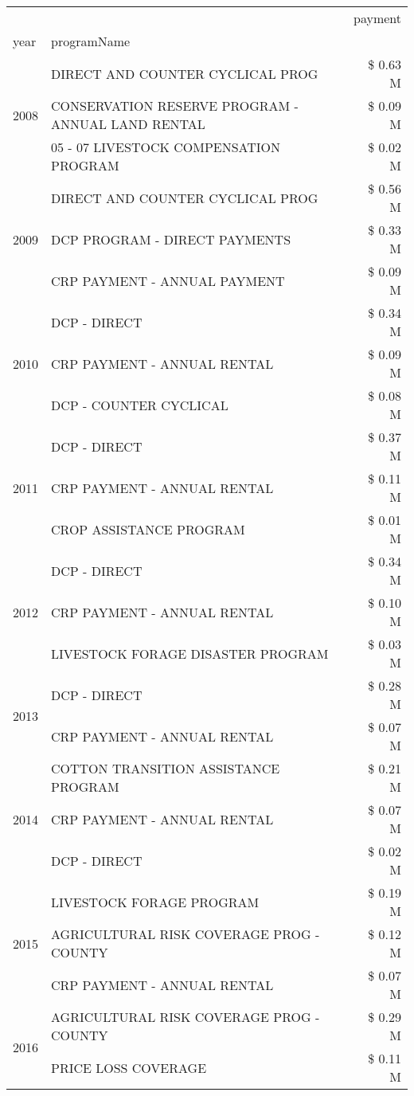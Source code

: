 \begin{tabular}{llr}
\toprule
 &  & payment \\
year & programName &  \\
\midrule
\multirow[t]{3}{*}{2008} & DIRECT AND COUNTER CYCLICAL PROG & \$ 0.63 M \\
 & CONSERVATION RESERVE PROGRAM - ANNUAL LAND RENTAL & \$ 0.09 M \\
 & 05 - 07 LIVESTOCK COMPENSATION PROGRAM & \$ 0.02 M \\
\cline{1-3}
\multirow[t]{3}{*}{2009} & DIRECT AND COUNTER CYCLICAL PROG & \$ 0.56 M \\
 & DCP PROGRAM - DIRECT PAYMENTS & \$ 0.33 M \\
 & CRP PAYMENT - ANNUAL PAYMENT & \$ 0.09 M \\
\cline{1-3}
\multirow[t]{3}{*}{2010} & DCP - DIRECT & \$ 0.34 M \\
 & CRP PAYMENT - ANNUAL RENTAL & \$ 0.09 M \\
 & DCP - COUNTER CYCLICAL & \$ 0.08 M \\
\cline{1-3}
\multirow[t]{3}{*}{2011} & DCP - DIRECT & \$ 0.37 M \\
 & CRP PAYMENT - ANNUAL RENTAL & \$ 0.11 M \\
 & CROP ASSISTANCE PROGRAM & \$ 0.01 M \\
\cline{1-3}
\multirow[t]{3}{*}{2012} & DCP - DIRECT & \$ 0.34 M \\
 & CRP PAYMENT - ANNUAL RENTAL & \$ 0.10 M \\
 & LIVESTOCK FORAGE DISASTER PROGRAM & \$ 0.03 M \\
\cline{1-3}
\multirow[t]{2}{*}{2013} & DCP - DIRECT & \$ 0.28 M \\
 & CRP PAYMENT - ANNUAL RENTAL & \$ 0.07 M \\
\cline{1-3}
\multirow[t]{3}{*}{2014} & COTTON TRANSITION ASSISTANCE PROGRAM & \$ 0.21 M \\
 & CRP PAYMENT - ANNUAL RENTAL & \$ 0.07 M \\
 & DCP - DIRECT & \$ 0.02 M \\
\cline{1-3}
\multirow[t]{3}{*}{2015} & LIVESTOCK FORAGE PROGRAM & \$ 0.19 M \\
 & AGRICULTURAL RISK COVERAGE PROG - COUNTY & \$ 0.12 M \\
 & CRP PAYMENT - ANNUAL RENTAL & \$ 0.07 M \\
\cline{1-3}
\multirow[t]{3}{*}{2016} & AGRICULTURAL RISK COVERAGE PROG - COUNTY & \$ 0.29 M \\
 & PRICE LOSS COVERAGE & \$ 0.11 M \\

\end{tabular}
